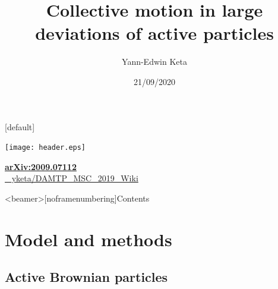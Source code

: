 \documentclass{beamer}
\title{Collective motion in large deviations of active particles}
\author{Yann-Edwin Keta}
\date{21/09/2020}
\begin{document}

{
\makeatletter
    [default]
    \def\beamer@entrycode{\vspace*{-\headheight}}
\begin{frame}[noframenumbering]

\vspace*{-4mm}
{
 \hspace*{-\beamerleftmargin}%
\begin{minipage}{\paperwidth}
\texttt{[image: header.eps]}
\end{minipage}
}

\titlepage

\begin{center}
{\bf\large \href{https://arxiv.org/abs/2009.07112}{arXiv:2009.07112}}\\
\vspace{10pt}
\href{https://github.com/yketa/DAMTP_MSC_2019_Wiki}{\footnotesize \faGithub~ yketa/DAMTP\_MSC\_2019\_Wiki}
\end{center}

\end{frame}
}


{\footerwithoutframenumber
\begin{frame}<beamer>[noframenumbering]{Contents}
  \tableofcontents
\end{frame}
}


\section{Model and methods}

\subsection{Active Brownian particles}
\end{document}
